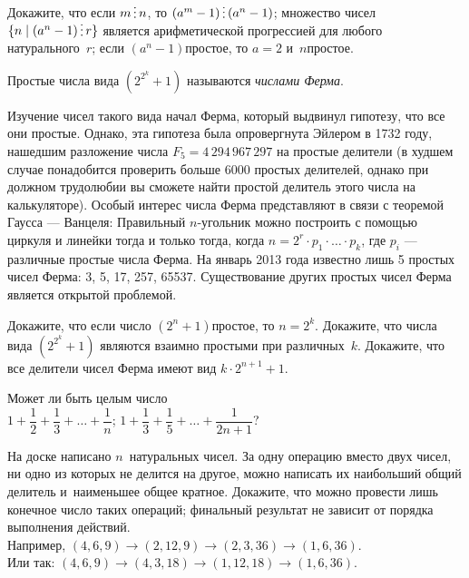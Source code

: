 \documentclass[a4paper,12pt]{article}
\begin{document}
Докажите, что
если $m \dv n$, то $(a^m-1) \dv (a^n-1)$;
множество чисел $\{n \mid (a^n-1)\dv r\}$ является арифметической прогрессией для любого натурального~$r$;
если $(a^n-1)$\т простое, то $a=2$ и~$n$\т простое.


Простые числа вида $(2^{2^k}+1)$ называются \emph{числами Ферма}.

{\small
Изучение чисел такого вида начал Ферма, который выдвинул гипотезу, что все они простые. Однако, эта гипотеза была опровергнута Эйлером в 1732 году, нашедшим разложение числа $F_5=4\,294\,967\,297$  на простые делители (в худшем случае понадобится проверить больше 6000 простых делителей, однако при должном трудолюбии вы сможете найти простой делитель этого числа на калькуляторе).
Особый интерес числа Ферма представляют в связи с теоремой Гаусса — Ванцеля:
Правильный $n$-угольник можно построить с помощью циркуля и линейки тогда и только тогда, когда $n=2^r\cdot p_1\cdot\ldots\cdot p_k$,  где $p_i$ --- различные простые числа Ферма.
На январь 2013 года известно лишь 5 простых чисел Ферма: 3, 5, 17, 257, 65537. Существование других простых чисел Ферма является открытой проблемой.
\par}

Докажите, что если число $(2^n+1)$\т простое, то $n=2^k$.
Докажите, что числа вида $(2^{2^k}+1)$ являются взаимно простыми при различных~$k$.
Докажите, что все делители чисел Ферма имеют вид $k\cdot 2^{n+1}+1$.


Может ли быть целым число\\
$1+\dfrac12+\dfrac13+\ldots+\dfrac1n$;
$1+\dfrac13+\dfrac15+\ldots+\dfrac1{2n+1}$?

На доске написано $n$~натуральных чисел. За одну операцию вместо двух чисел, ни одно из которых не делится на другое, можно написать их наибольший общий делитель и~наименьшее общее кратное. Докажите, что
можно провести лишь конечное число таких операций;
финальный результат не зависит от порядка выполнения действий.\\
Например, $(4,6,9)\to(2,12,9)\to(2,3,36)\to(1,6,36)$.\\
Или так: $(4,6,9)\to(4,3,18)\to(1,12,18)\to(1,6,36)$.

\vfill
{}
\end{document}

